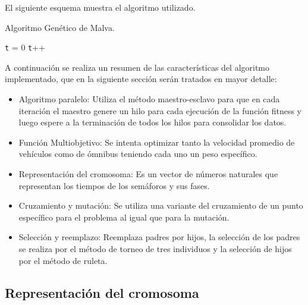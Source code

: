 El siguiente esquema muestra el algoritmo utilizado. 

\begin{algorithm}[H]
	\caption{Algoritmo Genético de Malva. }
	\label{alg:algoritmo_genetico_malva}
	\begin{algorithmic} [1] 
		{
			\STATE \texttt{t} = 0
			\STATE \texttt{t}++		
			\ENDWHILE
		}
	\end{algorithmic}
	
\end{algorithm}

A continuación se realiza un resumen de las características del algoritmo implementado, que en la siguiente sección serán tratados en mayor detalle:
\begin{itemize}

\item Algoritmo paralelo: Utiliza el método maestro-esclavo para que en cada iteración el maestro genere un hilo para cada ejecución  de la función fitness y luego espere a la terminación de todos los hilos para consolidar los datos. 
\item Función Multiobjetivo: Se intenta optimizar tanto la velocidad promedio de vehículos como de ómnibus teniendo cada uno un peso específico.
\item Representación del cromosoma: Es un vector de números naturales que representan los tiempos de los semáforos y sus fases.
\item Cruzamiento y mutación: Se utiliza una variante del cruzamiento de un punto específico para el problema al igual que para la mutación.
\item Selección y reemplazo: Reemplaza padres por hijos, la selección de los padres se realiza por el método de torneo de tres individuos y la selección de hijos por el método de ruleta.

\end{itemize}

\subsection{Representación del cromosoma}

